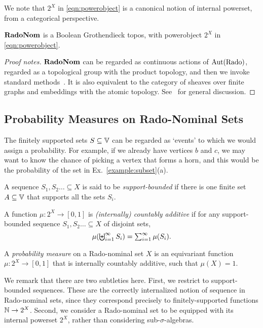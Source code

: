       We note that $2^X$ in \eqref{eqn:powerobject} is a canonical
      notion of internal powerset, from a categorical perspective.
\begin{proposition}\label{prop:radonom-topos}
$\mathbf{RadoNom}$ is a Boolean Grothendieck topos, with powerobject $2^X$ in \eqref{eqn:powerobject}. 
\end{proposition}
\begin{proof}[Proof notes]
  $\mathbf{RadoNom}$ can be regarded as continuous actions of $\operatorname{Aut}(\mathrm{Rado})$, regarded as a topological group with the product topology, and then we invoke standard methods~\cite[Ex.~A2.1.6]{elephant}. It is also equivalent to the category of sheaves over finite graphs and embeddings with the atomic topology. See~\cite{caramello-fraisse,caramello-toposic-galois} for general discussion.
\end{proof}

      \subsection{Probability Measures on Rado-Nominal Sets}\label{sec:rado-prob}
      The finitely supported sets $S\subseteq \mathbb{V}$ can be regarded as
      `events' to which we would assign a probability. For example,
      if we already have vertices $b$ and $c$, we may want to know the
      chance
      of picking a vertex that forms a horn, and this would be
      the probability of the set in Ex.~\ref{example:subset}(a).
      \begin{definition}\label{def:probability}
        A sequence $S_1,S_2\dots \subseteq X$ is said to be
        \emph{support-bounded} if there is one finite set $A\subseteq\mathbb{V}$ that
        supports all the sets $S_i$.

        A function $\mu:2^X\to[0,1]$ is \emph{(internally)
          countably additive} if for any
        support-bounded sequence $S_1,S_2\dots \subseteq X$ of disjoint sets, 
        \[\textstyle
          \mu(\biguplus_{i=1}^\infty S_i)=\sum_{i=1}^\infty\mu(S_i)\text.
        \]
        
        A \emph{probability measure} on a Rado-nominal set $X$ is an equivariant function
        $\mu:2^X\to [0,1]$ that is internally countably additive, such that $\mu(X) = 1$. \end{definition}
      We remark that there are two subtleties here. First,
      we restrict to support-bounded sequences. These are the
      correctly internalized notion of sequence in Rado-nominal
      sets,
      since they correspond precisely to finitely-supported functions $\mathbb{N}\to
      2^X$.
      Second, we consider a Rado-nominal set to be equipped with its internal powerset $2^X$, 
      rather than considering 
      sub-$\sigma$-algebras.

